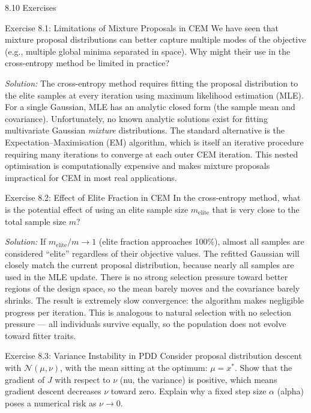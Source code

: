 \documentclass[aspectratio=169,10pt]{beamer}
\begin{document}
\begin{frame}[allowframebreaks]{8.10 Exercises}

\begin{block}{Exercise 8.1: Limitations of Mixture Proposals in CEM}
We have seen that mixture proposal distributions can better capture multiple modes of the objective (e.g., multiple global minima separated in space). Why might their use in the cross-entropy method be limited in practice?

\medskip
\textit{Solution:} The cross-entropy method requires fitting the proposal distribution to the elite samples at every iteration using maximum likelihood estimation (MLE). For a single Gaussian, MLE has an analytic closed form (the sample mean and covariance). Unfortunately, no known analytic solutions exist for fitting multivariate Gaussian \emph{mixture} distributions. The standard alternative is the Expectation--Maximisation (EM) algorithm, which is itself an iterative procedure requiring many iterations to converge at each outer CEM iteration. This nested optimisation is computationally expensive and makes mixture proposals impractical for CEM in most real applications.
\end{block}

\begin{block}{Exercise 8.2: Effect of Elite Fraction in CEM}
In the cross-entropy method, what is the potential effect of using an elite sample size $m_\text{elite}$ that is very close to the total sample size $m$?

\medskip
\textit{Solution:} If $m_\text{elite}/m \to 1$ (elite fraction approaches 100\%), almost all samples are considered ``elite'' regardless of their objective values. The refitted Gaussian will closely match the current proposal distribution, because nearly all samples are used in the MLE update. There is no strong selection pressure toward better regions of the design space, so the mean barely moves and the covariance barely shrinks. The result is extremely slow convergence: the algorithm makes negligible progress per iteration. This is analogous to natural selection with no selection pressure --- all individuals survive equally, so the population does not evolve toward fitter traits.
\end{block}

\framebreak

\begin{block}{Exercise 8.3: Variance Instability in PDD}
Consider proposal distribution descent with $\mathcal{N}(\mu, \nu)$, with the mean sitting at the optimum: $\mu = x^*$.
Show that the gradient of $J$ with respect to $\nu$ (nu, the variance) is positive, which means gradient descent decreases $\nu$ toward zero.
Explain why a fixed step size $\alpha$ (alpha) poses a numerical risk as $\nu \to 0$.


\end{block}
\end{frame}
\end{document}
